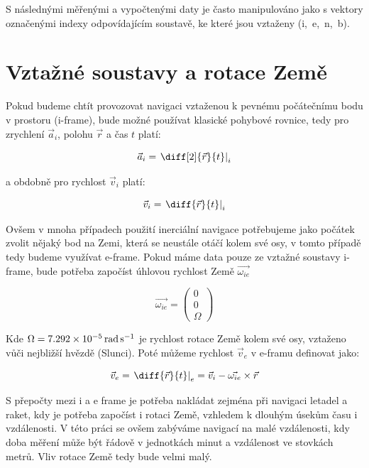 S následnými měřenými a vypočtenými daty je často manipulováno jako s vektory označenými indexy odpovídajícím soustavě, ke které jsou vztaženy (i,~e,~n,~b).

\section{Vztažné soustavy a rotace Země}
Pokud budeme chtít provozovat navigaci vztaženou k pevnému počátečnímu bodu v prostoru (i-frame), bude možné používat klasické pohybové rovnice, tedy pro zrychlení $ \vec{a}_{i} $, polohu $ \vec{r} $ a čas $ t $ platí: \cite{Tittertonc2004} 

\begin{equation} \label{eq:aiDiff}
\vec{a}_{i} = \left. \diff[2]{\vec{r}}{t} \right|_{i}
\end{equation}

a obdobně pro rychlost $ \vec{v}_{i} $ platí:

\begin{equation}
\vec{v}_{i} = \left. \diff{\vec{r}}{t} \right|_{i}
\end{equation}

Ovšem v mnoha případech použití inerciální navigace potřebujeme jako počátek zvolit nějaký bod na Zemi, která se neustále otáčí kolem své osy, v tomto případě tedy budeme využívat e-frame. Pokud máme data pouze ze vztažné soustavy i-frame, bude potřeba započíst úhlovou rychlost Země $ \vec{\omega_{ie}} $ \cite{Tittertonc2004} 

\begin{equation}
\vec{\omega_{ie}} = \begin{pmatrix} 0 \\ 0 \\ \Omega \end{pmatrix}
\end{equation}

Kde $ \Omega = \SI{7,292E-5}{\radian\per\second}$ je rychlost rotace Země kolem své osy, vztaženo vůči nejbližší hvězdě (Slunci). Poté můžeme rychlost $ \vec{v}_{e} $ v e-framu definovat jako: \cite{Tittertonc2004} \cite{Grewal2013}

\begin{equation}
\vec{v}_{e} = \left. \diff{\vec{r}}{t} \right|_{e} = \vec{v}_{i} - \vec{\omega_{ie}} \times \vec{r}
\end{equation}

S přepočty mezi i a e frame je potřeba nakládat zejména při navigaci letadel a raket, kdy je potřeba započíst i rotaci Země, vzhledem k dlouhým úsekům času i vzdálenosti. V této práci se ovšem zabýváme navigací na malé vzdálenosti, kdy doba měření může být řádově v jednotkách minut a vzdálenost ve stovkách metrů. Vliv rotace Země tedy bude velmi malý.

